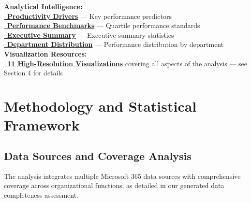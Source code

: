 \documentclass[12pt,a4paper]{article}
\newcommand{\styledvislink}[2]{\textcolor{warningAmber}{\href{#1}{{\normalsize\faChartLine}\, \textbf{#2}}}}
\begin{document}
\begin{resourcebox}
\textbf{Analytical Intelligence:}\\
\textcolor{successGreen}{\href{https://fixysaskihumorizijuv.supabase.co/storage/v1/object/public/research-files/dd2c8aa8-1c3d-4592-8ce2-9e275d102803-productivity_drivers_correlation.csv?download=}{{\normalsize\faCogs}\, \textbf{Productivity Drivers}}} — Key performance predictors\\
\textcolor{primaryGold}{\href{https://fixysaskihumorizijuv.supabase.co/storage/v1/object/public/research-files/e3bd4059-8cc7-437f-8aab-a2ed0700120e-performance_benchmarks_by_quartile.csv?download=}{{\normalsize\faChartArea}\, \textbf{Performance Benchmarks}}} — Quartile performance standards\\
\textcolor{mediumGray}{\href{https://fixysaskihumorizijuv.supabase.co/storage/v1/object/public/research-files/74906882-50ed-4947-8d41-ff2fcf4bebf3-overall_productivity_summary.csv?download=}{{\normalsize\faClipboard}\, \textbf{Executive Summary}}} — Executive summary statistics\\
\textcolor{primaryBlue}{\href{https://fixysaskihumorizijuv.supabase.co/storage/v1/object/public/research-files/61dcab8f-47f2-46f1-855f-7e95c4447bf0-department_performance_distribution.csv?download=}{{\normalsize\faSitemap}\, \textbf{Department Distribution}}} — Performance distribution by department\\[0.5em]

\textbf{Visualization Resources:}\\
\styledvislink{https://fixysaskihumorizijuv.supabase.co/storage/v1/object/public/research-files/d43b6a0f-3ff0-499d-8fb5-f84b653d96d0-visualization_descriptions.csv?download=}{11 High-Resolution Visualizations} covering all aspects of the analysis — see Section 4 for details
\end{resourcebox}

\section{Methodology and Statistical Framework}

\subsection{Data Sources and Coverage Analysis}

The analysis integrates multiple Microsoft 365 data sources with comprehensive coverage across organizational functions, as detailed in our generated data completeness assessment.
\end{document}

